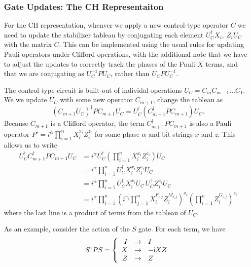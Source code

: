 \subsubsection*{Gate Updates: The CH Representaiton}
For the CH representation, whenver we apply a new control-type operator $C$ we need to update the stabilizer tableau by conjugating each element $U_{C}^{\dagger}X_{i},\,Z_{i}U_{C}$ with the matrix $C$. This can be implemented using the usual rules for updating Pauli operators under Clifford operations, with the additional note that we have to adjust the updates to correctly track the phases of the Pauli $X$ terms, and that we are conjugating as $U_{C}^{-1}PU_{C}$, rather than $U_{C}PU_{C}^{-1}$. \par
The control-type circuit is built out of individal operations $U_{C}=C_{m}C_{m-1}\dots C_{1}$. We we update $U_{C}$ with some new operator $C_{m+1}$, change the tableau as
\begin{equation}
\left(C_{m+1}U_{C}\right)^{\dagger} P C_{m+1}U_{C} = U_{C}^{\dagger} \left(C_{m+1}^{\dagger}PC_{m+1}\right)U_{C}.
\end{equation}
Because $C_{m+1}$ is a Clifford operator, the term $C^{\dagger}_{m+1}PC_{m+1}$ is also a Pauli operator $P'=i^{\alpha}\prod_{i=1}^{n}X_{i}^{x_{i}}Z_{i}^{z_{i}}$ for some phase $\alpha$ and bit strings $x$ and $z$. This allows us to write
\begin{align}
U_{C}^{\dagger} C_{m+1}^{\dagger}PC_{m+1} U_{C} &= i^{\alpha} U_{C}^{\dagger}\left(\prod_{i=1}^{n}X_{i}^{x_{i}}Z_{i}^{z_{i}}\right)U_{C} \nonumber \\
&= i^{\alpha} \prod_{i=1}^{n} U_{C}^{\dagger} X_{i}^{x_{i}} Z_{i}^{z_{i}}U_{C} \nonumber \\
&= i^{\alpha} \prod_{i=1}^{n}U_{C}^{\dagger} X_{i}^{x_{i}}U_{C}\,U_{C}^{\dagger}Z_{i}^{z_{i}}U_{C} \nonumber \\
&= i^{\alpha} \prod_{i=1}^{n}\left(i^{\gamma_{i}} \prod_{j=1}^{n}X_{i}^{F_{i,j}}Z_{i}^{M_{i,j}}\right)^{x_{i}}\left(\prod_{i=1}^{n}Z_{i}^{G_{i,j}}\right)^{z_{i}}
\label{eq:expanded_leftupdate}
\end{align}
where the last line is a product of terms from the tableau of $U_{C}$.\par
As an example, consider the action of the $S$ gate. For each term, we have
\[
S^{\dagger}PS =  \left\{ \begin{array}{rcl}
    I & \rightarrow & I \\
    X & \rightarrow & -\mathrm{i} XZ \\
    Z & \rightarrow & Z \\
    \end{array}\right.
\]
